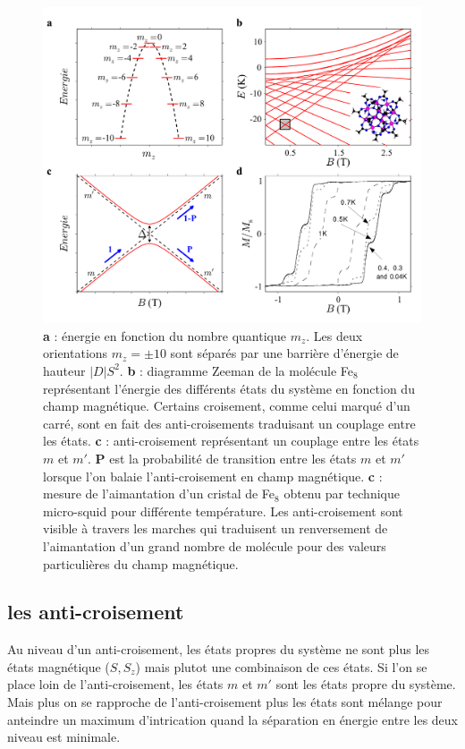 \begin{figure}
\centering \includegraphics[scale=0.5]{Theorie/MagMol/figure3/figure3.pdf} 
\caption{\textbf{a} : énergie en fonction du nombre quantique $m_z$. Les deux orientations $m_z=\pm 10$ sont séparés par une barrière d'énergie de hauteur $|D|S^2$. \textbf{b} : diagramme Zeeman de la molécule Fe$_8$ représentant l'énergie des différents états du système en fonction du champ magnétique. Certains croisement, comme celui marqué d'un carré, sont en fait des anti-croisements traduisant un couplage entre les états. \textbf{c} : anti-croisement représentant un couplage entre les états $m$ et $m'$. \textbf{P} est la probabilité de transition entre les états $m$ et $m'$ lorsque l'on balaie l'anti-croisement en champ magnétique. \textbf{c} : mesure de l'aimantation d'un cristal de Fe$_8$ obtenu par technique micro-squid pour différente température. Les anti-croisement sont visible à travers les marches qui traduisent un renversement de l'aimantation d'un grand nombre de molécule pour des valeurs particulières du champ magnétique.}
\label{Fe8Zeeman}
\end{figure}

\subsection{les anti-croisement}
Au niveau d'un anti-croisement, les états propres du système ne sont plus les états magnétique ($S,S_z$) mais plutot une combinaison de ces états. Si l'on se place loin de l'anti-croisement, les états $m$ et $m'$ sont les états propre du système. Mais plus on se rapproche de l'anti-croisement plus les états sont mélange pour anteindre un maximum d'intrication quand la séparation en énergie entre les deux niveau est minimale.

